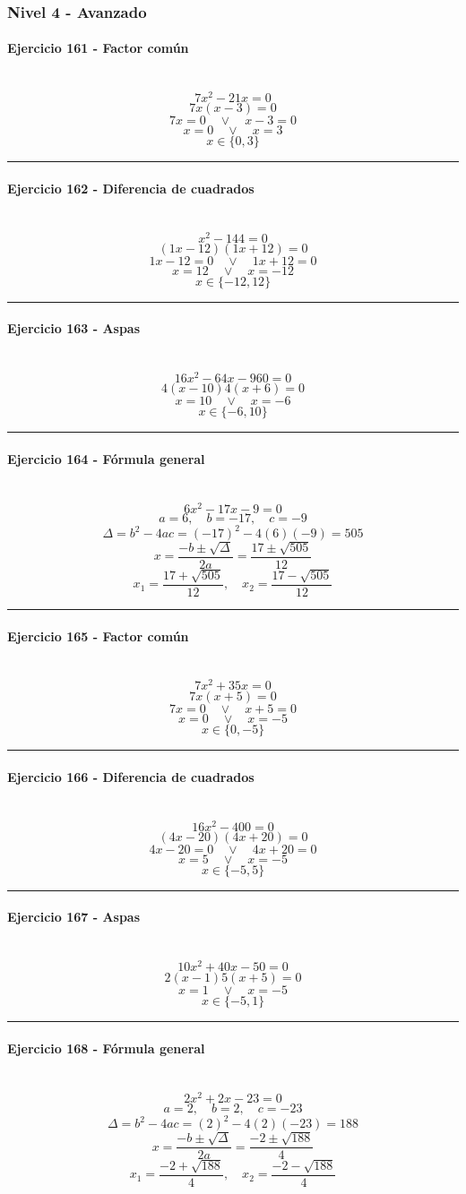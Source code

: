 \documentclass[10pt,a4paper]{article}
\newcommand{\res}[1]{\paragraph{#1}\mbox{}\\[-1.2em]}
\begin{document}
\subsubsection*{Nivel 4 - Avanzado}
\res{Ejercicio 161 - Factor común}
\[ 7 x^{2} - 21 x=0 \]
\[ 7x(x-3)=0 \]
\[ 7x=0 \quad \vee \quad x-3=0 \]
\[ x=0 \quad \vee \quad x=3 \]
\[ \boxed{x\in\{0,3\}} \]
\vspace{1mm}\hrule\vspace{2mm}
\res{Ejercicio 162 - Diferencia de cuadrados}
\[ x^{2} - 144=0 \]
\[ (1x-12)(1x+12)=0 \]
\[ 1x-12=0 \quad \vee \quad 1x+12=0 \]
\[ x=12 \quad \vee \quad x=-12 \]
\[ \boxed{x\in\{-12,12\}} \]
\vspace{1mm}\hrule\vspace{2mm}
\res{Ejercicio 163 - Aspas}
\[ 16 x^{2} - 64 x - 960=0 \]
\[ 4(x-10)4(x+6)=0 \]
\[ x=10 \quad \vee \quad x=-6 \]
\[ \boxed{x\in\{-6,10\}} \]
\vspace{1mm}\hrule\vspace{2mm}
\res{Ejercicio 164 - Fórmula general}
\[ 6 x^{2} - 17 x - 9=0 \]
\[ a=6,\quad b=-17,\quad c=-9 \]
\[ \Delta=b^2-4ac=(-17)^2-4(6)(-9)=505 \]
\[ x=\frac{-b\pm\sqrt{\Delta}}{2a}=\frac{17\pm\sqrt{505}}{12} \]
\[ \boxed{x_1=\frac{17+\sqrt{505}}{12},\quad x_2=\frac{17-\sqrt{505}}{12}} \]
\vspace{1mm}\hrule\vspace{2mm}
\res{Ejercicio 165 - Factor común}
\[ 7 x^{2} + 35 x=0 \]
\[ 7x(x+5)=0 \]
\[ 7x=0 \quad \vee \quad x+5=0 \]
\[ x=0 \quad \vee \quad x=-5 \]
\[ \boxed{x\in\{0,-5\}} \]
\vspace{1mm}\hrule\vspace{2mm}
\res{Ejercicio 166 - Diferencia de cuadrados}
\[ 16 x^{2} - 400=0 \]
\[ (4x-20)(4x+20)=0 \]
\[ 4x-20=0 \quad \vee \quad 4x+20=0 \]
\[ x=5 \quad \vee \quad x=-5 \]
\[ \boxed{x\in\{-5,5\}} \]
\vspace{1mm}\hrule\vspace{2mm}
\res{Ejercicio 167 - Aspas}
\[ 10 x^{2} + 40 x - 50=0 \]
\[ 2(x-1)5(x+5)=0 \]
\[ x=1 \quad \vee \quad x=-5 \]
\[ \boxed{x\in\{-5,1\}} \]
\vspace{1mm}\hrule\vspace{2mm}
\res{Ejercicio 168 - Fórmula general}
\[ 2 x^{2} + 2 x - 23=0 \]
\[ a=2,\quad b=2,\quad c=-23 \]
\[ \Delta=b^2-4ac=(2)^2-4(2)(-23)=188 \]
\[ x=\frac{-b\pm\sqrt{\Delta}}{2a}=\frac{-2\pm\sqrt{188}}{4} \]
\[ \boxed{x_1=\frac{-2+\sqrt{188}}{4},\quad x_2=\frac{-2-\sqrt{188}}{4}} \]
\end{document}
